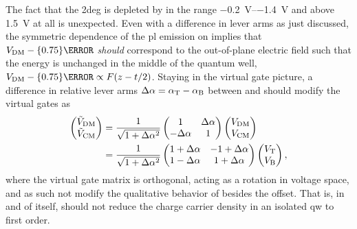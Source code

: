The fact that the \gls{2deg} is depleted by \VDM in the range \qtyrange{-0.2}{-1.4}{\volt} and above \qty{1.5}{\volt} at all is unexpected.
Even with a difference in lever arms as just discussed, the symmetric dependence of the \gls{pl} emission on \VDM implies that $\VDM - \qty{0.75}{\volt}$ \emph{should} correspond to the out-of-plane electric field such that the energy is unchanged in the middle of the quantum well, $\VDM - \qty{0.75}{\volt} \propto F(z-t/2)$.
Staying in the virtual gate picture, a difference in relative lever arms
$\Delta\alpha = \alpha_{\mathrm{T}} - \alpha_{\mathrm{B}}$ between \VT and \VB should modify the virtual gates as
\begin{align}\label{eq:exp:virtual_gates}
    \begin{pmatrix}
        \tilde{V}_{\mathrm{DM}} \\
        \tilde{V}_{\mathrm{CM}}
    \end{pmatrix}
    &= \frac{1}{\sqrt{1 + \Delta\alpha^2}}\begin{pmatrix}
        1 & \Delta\alpha \\
        -\Delta\alpha & 1
    \end{pmatrix}\begin{pmatrix}
        V_{\mathrm{DM}} \\
        V_{\mathrm{CM}}
    \end{pmatrix} \\
    &= \frac{1}{\sqrt{1 + \Delta\alpha^2}}\begin{pmatrix}
        1 + \Delta\alpha & -1 + \Delta\alpha \\
         1 - \Delta\alpha & 1 + \Delta\alpha
    \end{pmatrix}\begin{pmatrix}
        V_{\mathrm{T}} \\
        V_{\mathrm{B}}
    \end{pmatrix},
\end{align}
where the virtual gate matrix is orthogonal, acting as a rotation in voltage space, and as such not modify the qualitative behavior of \VDM besides the offset.
That is, in and of itself, \VDM should not reduce the charge carrier density in an isolated \gls{qw} to first order.


